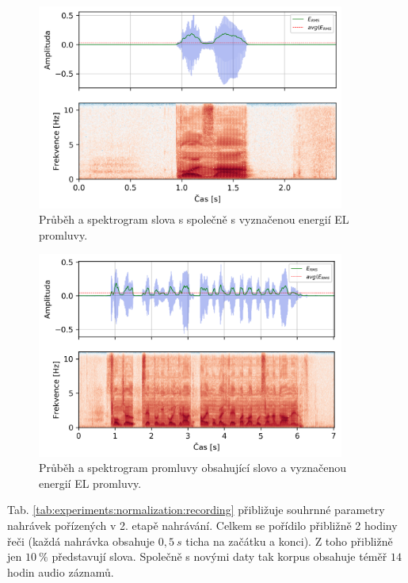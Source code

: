 \begin{figure}[hbpt]
  \centering
  \includegraphics[width=0.9\textwidth]{./ch4-experiments/img/energy_spec_word.png}
  \caption{Průběh a spektrogram slova  s společně s vyznačenou energií EL promluvy.}
  \label{fig:experiments:normalization:word}
\end{figure}

\begin{figure}[hbpt]
  \centering
  \includegraphics[width=0.9\textwidth]{./ch4-experiments/img/energy_spec_sentence.png}
  \caption{Průběh a spektrogram promluvy obsahující slovo  a vyznačenou energií EL promluvy.}
  \label{fig:experiments:normalization:sentence}
\end{figure}

Tab. \ref{tab:experiments:normalization:recording} přibližuje souhrnné parametry nahrávek pořízených v 2. etapě nahrávání. Celkem se pořídilo přibližně 2 hodiny řeči (každá nahrávka obsahuje $0,5\ s$ ticha na začátku a konci). Z toho přibližně jen $10\ \%$ představují slova. Společně s novými daty tak korpus obsahuje téměř $14$ hodin audio záznamů.

